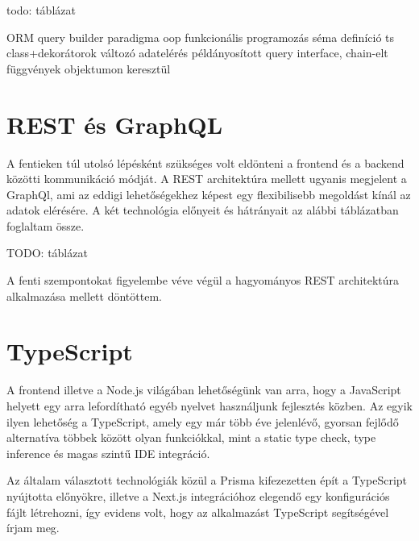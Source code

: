 todo: táblázat

                  ORM                     query builder
paradigma         oop                  funkcionális programozás
séma definíció  ts class+dekorátorok         változó
adatelérés     példányosított            query interface, chain-elt függvények
              objektumon keresztül




\section{REST és GraphQL}

A fentieken túl utolsó lépésként szükséges volt eldönteni a frontend és a backend közötti kommunikáció módját.
A REST architektúra mellett ugyanis megjelent a GraphQl, ami az eddigi lehetőségekhez képest egy flexibilisebb megoldást kínál az adatok elérésére.
A két technológia előnyeit és hátrányait az alábbi táblázatban foglaltam össze.

TODO: táblázat

A fenti szempontokat figyelembe véve végül a hagyományos REST architektúra alkalmazása mellett döntöttem.

\section{TypeScript}
A frontend illetve a Node.js világában lehetőségünk van arra, hogy a JavaScript helyett egy arra lefordítható
egyéb nyelvet használjunk fejlesztés közben. Az egyik ilyen lehetőség a TypeScript, amely egy már több éve jelenlévő,
gyorsan fejlődő alternatíva többek között olyan funkciókkal, mint a static type check, type inference és magas szintű IDE
integráció.

Az általam választott technológiák közül a Prisma kifezezetten épít a TypeScript nyújtotta előnyökre, illetve a Next.js
integrációhoz elegendő egy konfigurációs fájlt létrehozni, így evidens volt, hogy az alkalmazást TypeScript segítségével írjam meg.

